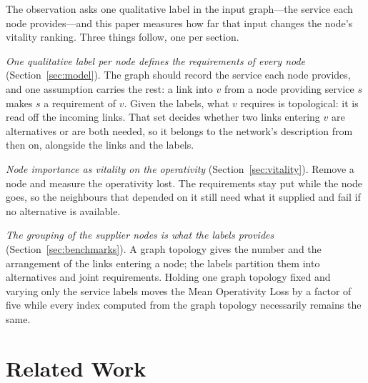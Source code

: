 \documentclass{svproc}
\begin{document}
The observation asks one qualitative label in the input graph---the service each node
provides---and this paper measures how far that input changes the node's vitality ranking. Three
things follow, one per section.

\emph{One qualitative label per node defines the requirements of every node}
(Section~\ref{sec:model}). The graph should record the service each node provides,
and one assumption carries the rest: a link into $v$ from a node providing
service $s$ makes $s$ a requirement of $v$. Given the labels, what $v$ requires
is topological: it is read off the incoming links. That set decides whether two
links entering $v$ are alternatives or are both needed, so it belongs to the
network's description from then on, alongside the links and the labels.

\emph{Node importance as vitality on the operativity} (Section~\ref{sec:vitality}).
Remove a node and measure the operativity lost. The requirements stay put while
the node goes, so the neighbours that depended on it still need what it supplied
and fail if no alternative is available.

\emph{The grouping of the supplier nodes is what the labels provides}
(Section~\ref{sec:benchmarks}). A graph topology gives the number and the
arrangement of the links entering a node; the labels partition them into
alternatives and joint requirements. Holding one graph topology fixed and varying
only the service labels moves the Mean Operativity Loss by a factor of five while
every index computed from the graph topology necessarily remains the same.


\section{Related Work}
\label{sec:related}
\end{document}
